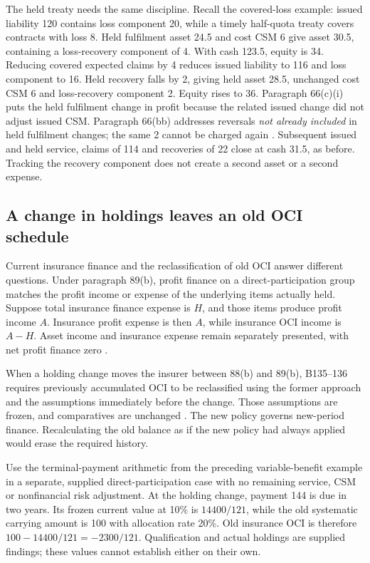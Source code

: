 The held treaty needs the same discipline. Recall the covered-loss example:
issued liability 120 contains loss component 20, while a timely half-quota
treaty covers contracts with loss 8. Held fulfilment asset 24.5 and cost CSM
6 give asset 30.5, containing a loss-recovery component of 4. With cash 123.5,
equity is 34. Reducing covered expected claims by 4 reduces issued liability
to 116 and loss component to 16. Held recovery falls by 2, giving held asset
28.5, unchanged cost CSM 6 and loss-recovery component 2. Equity rises to 36.
Paragraph 66(c)(i) puts the held fulfilment change in profit because the related
issued change did not adjust issued CSM. Paragraph 66(bb) addresses reversals
\emph{not already included} in held fulfilment changes; the same 2 cannot
be charged again \citep[IFRS~17.66(bb),66(c)(i),B119F]{eu20231803}.
Subsequent issued and held service, claims of 114 and recoveries of 22 close
at cash 31.5, as before. Tracking the recovery component does not create a
second asset or a second expense.

\subsection{A change in holdings leaves an old OCI schedule}
\label{sec:insurance-frozen-oci-origins}

Current insurance finance and the reclassification of old OCI answer different
questions. Under paragraph 89(b), profit finance on a direct-participation group
matches the profit income or expense of the underlying items actually held.
Suppose total insurance finance expense is \(H\), and those items produce
profit income \(A\). Insurance profit expense is then \(A\), while
insurance OCI income is \(A-H\). Asset income and insurance expense remain
separately presented, with net profit finance zero
\citep[IFRS~17.89--90,B134]{eu20231803}.

When a holding change moves the insurer between 88(b) and 89(b), B135--136
requires previously accumulated OCI to be reclassified using the former
approach and the assumptions immediately before the change. Those assumptions
are frozen, and comparatives are unchanged \citep[IFRS~17.B135--136]{eu20231803}.
The new policy governs new-period finance. Recalculating the old balance as if
the new policy had always applied would erase the required history.

Use the terminal-payment arithmetic from the preceding variable-benefit example
in a separate, supplied direct-participation case with no remaining service,
CSM or nonfinancial risk adjustment. At the holding change, payment 144 is due
in two years. Its frozen current value at 10\% is \(14400/121\), while
the old systematic carrying amount is 100 with allocation rate 20\%.
Old insurance OCI is therefore
\(100-14400/121=-2300/121\). Qualification and actual holdings are supplied
findings; these values cannot establish either on their own.

